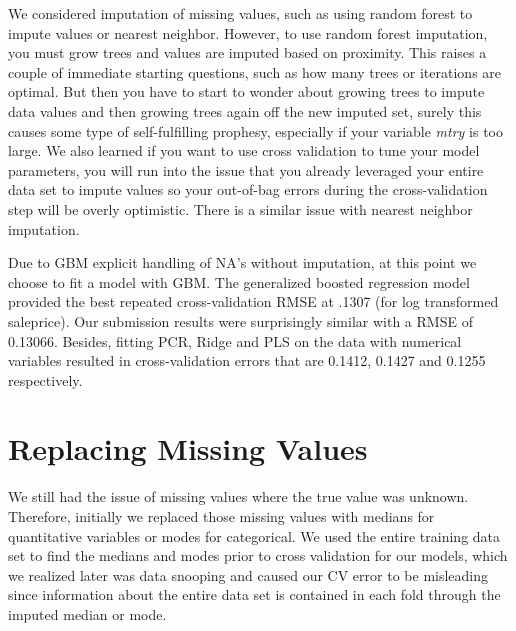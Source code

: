 \documentclass[12pt]{article}
\begin{document}
We considered imputation of missing values, such as using random forest to impute values or nearest neighbor.  However, to use random forest imputation, you must grow trees and values are imputed based on proximity.  This raises a couple of immediate starting questions, such as how many trees or iterations are optimal.  But then you have to start to wonder about growing trees to impute data values and then growing trees again off the new imputed set, surely this causes some type of self-fulfilling prophesy, especially if your variable \emph{mtry} is too large.  We also learned if you want to use cross validation to tune your model parameters, you will run into the issue that you already leveraged your entire data set to impute values so your out-of-bag errors during the cross-validation step will be overly optimistic.  There is a similar issue with nearest neighbor imputation.

Due to GBM explicit handling of NA's without imputation, at this point we choose to fit a model with GBM.  The generalized boosted regression model provided the best repeated cross-validation RMSE at .1307 (for log transformed saleprice). Our submission results were surprisingly similar with a RMSE of 0.13066. %
Besides, fitting PCR, Ridge and PLS on the data with numerical variables resulted in cross-validation errors that are 0.1412, 0.1427 and 0.1255 respectively.

\section{Replacing Missing Values}

We still had the issue of missing values where the true value was unknown.  Therefore, initially we replaced those missing values with medians for quantitative variables or modes for categorical.  We used the entire training data set to find the medians and modes prior to cross validation for our models, which we realized later was data snooping and  caused our CV error to be misleading since information about the entire data set is contained in each fold through the imputed median or mode.
\end{document}
